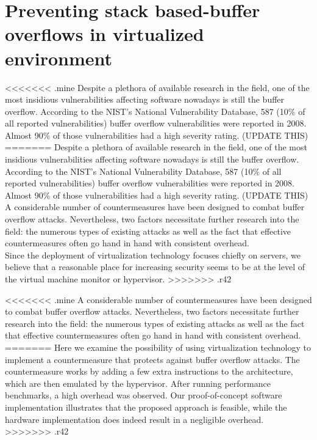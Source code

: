 \chapter{Preventing stack based-buffer overflows in virtualized environment}\label{instructionlevel}
<<<<<<< .mine
Despite a plethora of available research in the field, one of the most insidious vulnerabilities affecting software nowadays is still the buffer overflow. According to the NIST's National Vulnerability Database\cite{nist}, 587 (10\% of all reported vulnerabilities) buffer overflow vulnerabilities were reported in 2008. Almost 90\% of those vulnerabilities had a high severity rating. (UPDATE THIS)
=======
Despite a plethora of available research in the field, one of the most insidious vulnerabilities affecting software nowadays is still the buffer overflow. According to the NIST's National Vulnerability Database\cite{nist}, 587 (10\% of all reported vulnerabilities) buffer overflow vulnerabilities were reported in 2008. Almost 90\% of those vulnerabilities had a high severity rating. (UPDATE THIS)\\
A considerable number of countermeasures have been designed to combat buffer overflow attacks. Nevertheless, two factors necessitate further research into the field: the numerous types of existing attacks as well as the fact that effective countermeasures often go hand in hand with consistent overhead.  \\
Since the deployment of virtualization technology focuses chiefly on servers, we believe that a reasonable place for increasing security seems to be at the level of the virtual machine monitor or hypervisor.
>>>>>>> .r42

<<<<<<< .mine
A considerable number of countermeasures have been designed to combat buffer overflow attacks. Nevertheless, two factors necessitate further research into the field: the numerous types of existing attacks as well as the fact that effective countermeasures often go hand in hand with consistent overhead.  \\
=======
Here we examine the possibility of using virtualization technology to implement a countermeasure that protects against buffer overflow attacks. 
The countermeasure works by adding a few extra instructions to the architecture, which are then emulated by the hypervisor. 
After running performance benchmarks, a high overhead was observed. Our proof-of-concept software implementation illustrates that the proposed approach is feasible, while the hardware implementation does indeed result in a negligible overhead. 
>>>>>>> .r42

